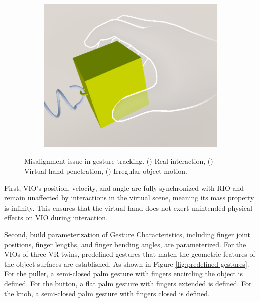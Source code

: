 \documentclass[runningheads]{llncs}
\begin{document}
\begin{figure}
\begin{subfigure}{0.31\linewidth}
    \caption{} %
    \label{fig:gesture-tracking-deviations-b}
  \end{subfigure}
  \hfill %
  \begin{subfigure}{0.31\linewidth} %
    \centering
    \includegraphics[width=\linewidth]{image/gesture-tracking-deviations-c.pdf}
    \caption{} %
    \label{fig:gesture-tracking-deviations-c}
  \end{subfigure}
  \caption{Misalignment issue in gesture tracking. () Real interaction, () Virtual hand penetration, () Irregular object motion.}
  \label{fig:gesture-tracking-deviations}
\end{figure}

First, VIO's position, velocity, and angle are fully synchronized with RIO and remain unaffected by interactions in the virtual scene, meaning its mass property is infinity. This ensures that the virtual hand does not exert unintended physical effects on VIO during interaction.

Second, build parameterization of Gesture Characteristics, including finger joint positions, finger lengths, and finger bending angles, are parameterized. For the VIOs of three VR twins, predefined gestures that match the geometric features of the object surfaces are established. As shown in Figure \ref{fig:predefined-gestures}. For the puller, a semi-closed palm gesture with fingers encircling the object is defined. For the button, a flat palm gesture with fingers extended is defined. For the knob, a semi-closed palm gesture with fingers closed is defined.
\end{document}
